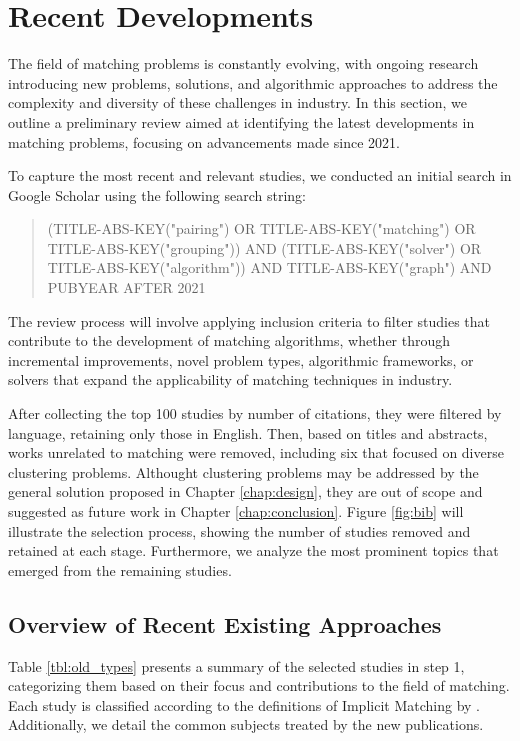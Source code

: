         

    \section{Recent Developments}
    
    The field of matching problems is constantly evolving, with ongoing research introducing new problems, solutions, and algorithmic approaches to address the complexity and diversity of these challenges in industry. In this section, we outline a preliminary review aimed at identifying the latest developments in matching problems, focusing on advancements made since 2021.
    
    To capture the most recent and relevant studies, we conducted an initial search in Google Scholar using the following search string:
    
    \begin{quote}
    (TITLE-ABS-KEY("pairing") OR TITLE-ABS-KEY("matching") OR TITLE-ABS-KEY("grouping")) AND (TITLE-ABS-KEY("solver") OR TITLE-ABS-KEY("algorithm")) AND TITLE-ABS-KEY("graph") AND PUBYEAR AFTER 2021
    \end{quote}
    
    The review process will involve applying inclusion criteria to filter studies that contribute to the development of matching algorithms, whether through incremental improvements, novel problem types, algorithmic frameworks, or solvers that expand the applicability of matching techniques in industry.
    
    After collecting the top 100 studies by number of citations, they were filtered by language, retaining only those in English. Then, based on titles and abstracts, works unrelated to matching were removed, including six that focused on diverse clustering problems. Althought clustering problems may be addressed by the general solution proposed in Chapter \ref{chap:design}, they are out of scope and suggested as future work in Chapter \ref{chap:conclusion}.  Figure \ref{fig:bib} will illustrate the selection process, showing the number of studies removed and retained at each stage. Furthermore, we analyze the most prominent topics that emerged from the remaining studies.
    
    
    
    \subsection{Overview of Recent Existing Approaches}
    Table \ref{tbl:old_types} presents a summary of the selected studies in step 1, categorizing them based on their focus and contributions to the field of matching. Each study is classified according to the definitions of Implicit Matching by \cite{ieee_survey}. Additionally, we detail the common subjects treated by the new publications.


